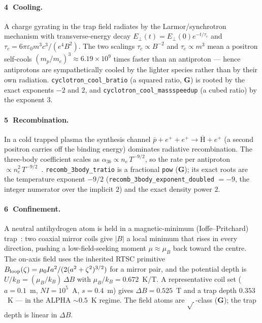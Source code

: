 \documentclass[11pt,a4paper]{article}
\newcommand{\tierGreen}{\textbf{G}}
\newcommand{\stg}[1]{\textcircled{\scriptsize#1}}
\begin{document}
\paragraph{\stg{4} Cooling.} A charge gyrating in the trap field radiates by
the Larmor/synchrotron mechanism with transverse-energy decay
$E_\perp(t)=E_\perp(0)e^{-t/\tau_c}$ and
$\tau_c=6\pi\varepsilon_0 m^3 c^3/(e^4 B^2)$. The two scalings
$\tau_c\propto B^{-2}$ and $\tau_c\propto m^3$ mean a positron self-cools
$(m_p/m_e)^3\approx6.19\times10^{9}$ times faster than an antiproton ---
hence antiprotons are sympathetically cooled by the lighter species rather
than by their own radiation. \texttt{cyclotron\_cool\_bratio} (a squared
ratio, \tierGreen) is rooted by the exact exponents $-2$ and $2$, and
\texttt{cyclotron\_cool\_massspeedup} (a cubed ratio) by the exponent $3$.

\paragraph{\stg{5} Recombination.} In a cold trapped plasma the synthesis
channel $\bar p+e^++e^+\to\overline{\text{H}}+e^+$ (a second positron
carries off the binding energy) dominates radiative recombination. The
three-body coefficient scales as $\alpha_{3b}\propto n_e\,T^{-9/2}$, so the
rate per antiproton $\propto n_e^2\,T^{-9/2}$~\citep{Mansbach1969,Glinsky1991}.
\texttt{recomb\_3body\_tratio} is a fractional \texttt{pow} (\tierGreen);
its exact roots are the temperature exponent $-9/2$
(\texttt{recomb\_3body\_exponent\_doubled} $=-9$, the integer numerator over
the implicit $2$) and the exact density power $2$.

\paragraph{\stg{6} Confinement.} A neutral antihydrogen atom is held in a
magnetic-minimum (Ioffe--Pritchard) trap~\citep{Pritchard1983,Andresen2010}:
two coaxial mirror coils give $|B|$ a local minimum that rises in every
direction, pushing a low-field-seeking moment $\mu\approx\mu_B$ back toward
the centre. The on-axis field uses the inherited RTSC primitive
$B_{\rm loop}(\zeta)=\mu_0 I a^2/(2(a^2+\zeta^2)^{3/2})$ for a mirror pair,
and the potential depth is $U/k_B=(\mu_B/k_B)\,\Delta B$ with
$\mu_B/k_B=0.672$~K/T. A representative coil set
($a=0.1$~m, $NI=10^5$~A, $s=0.4$~m) gives $\Delta B=0.525$~T and a trap
depth $0.353$~K --- in the ALPHA $\sim\!0.5$~K regime. The field atoms are
$\sqrt{\,}$-class (\tierGreen); the trap depth is linear in $\Delta B$.
\end{document}
